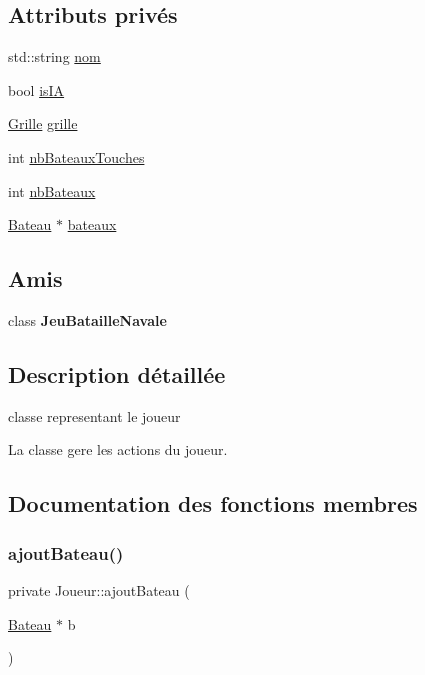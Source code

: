\subsection*{Attributs privés}
\begin{DoxyCompactItemize}
\item 
std\+::string \mbox{\hyperlink{class_joueur_abaee0b4f259181bf66dbab54bef971bb}{nom}}
\item 
bool \mbox{\hyperlink{class_joueur_ac9305d8a63a4a02417bf2f64a357ee8d}{is\+IA}}
\item 
\mbox{\hyperlink{class_grille}{Grille}} \mbox{\hyperlink{class_joueur_a97a052f0b9966c94c49862df3144a62f}{grille}}
\item 
int \mbox{\hyperlink{class_joueur_a31a012996f56cdcf9e7a84587cd513fd}{nb\+Bateaux\+Touches}}
\item 
int \mbox{\hyperlink{class_joueur_a56752b0a96da94b17b07fd0312035a13}{nb\+Bateaux}}
\item 
\mbox{\hyperlink{class_bateau}{Bateau}} $\ast$ \mbox{\hyperlink{class_joueur_acf537ce482b493555318da7da14d8ac9}{bateaux}}
\end{DoxyCompactItemize}
\subsection*{Amis}
\begin{DoxyCompactItemize}
\item 
\mbox{\label{class_joueur_a5e820295bb9a9381c14f9067e97ca6c1}} 
class {\bfseries Jeu\+Bataille\+Navale}
\end{DoxyCompactItemize}


\subsection{Description détaillée}
classe representant le joueur 

La classe gere les actions du joueur. 

\subsection{Documentation des fonctions membres}
\mbox{\label{class_joueur_a063d68698a264c0b68d29d1c5249958c}} 
\subsubsection{\texorpdfstring{ajout\+Bateau()}{ajoutBateau()}}
{\footnotesize\ttfamily private Joueur\+::ajout\+Bateau (\begin{DoxyParamCaption}\item[{\mbox{\hyperlink{class_bateau}{Bateau}} $\ast$}]{b }\end{DoxyParamCaption})\hspace{0.3cm}{\ttfamily [private]}}



